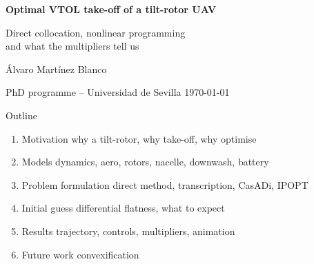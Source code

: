 \documentclass[11pt]{article}
\newcommand{\cursec}{}
\renewcommand{\section}[1]{\gdef\cursec{#1}}
\newcommand{\aircraft}[2]{%
  \begin{scope}[rotate=#2]
    \fill[gray!35, draw=gray!70!black, rounded corners=2pt] (-1.6,-0.17) rectangle (1.6,0.17);
    \fill[gray!70] (0.55,0.15) rectangle (1.05,0.21);      %
    \fill[gray!70] (-1.35,0.15) rectangle (-0.85,0.21);    %
    \foreach \xp in {0.8,-1.1}{
      \begin{scope}[shift={(\xp,0.45)}, rotate=#1-90]
        \fill[gray!55, draw=gray!70!black] (-0.07,-0.25) rectangle (0.07,0.1);
        \draw[line width=1.6pt, gray!40!black] (-0.5,0.12) -- (0.5,0.12);
      \end{scope}}
  \end{scope}}
\begin{document}
\begin{frame}[plain]
  \vspace*{9mm}
  {\LARGE\bfseries\color{accent} Optimal VTOL take-off of a tilt-rotor UAV\par}
  \vspace{2mm}
  {\large Direct collocation, nonlinear programming\\and what the multipliers tell us\par}
  \vspace{6mm}
  {\normalsize Álvaro Martínez Blanco\par}
  {\small\color{muted} PhD programme -- Universidad de Sevilla \quad\textbullet\quad \today\par}
  \vfill
  \hfill
\end{frame}

\begin{frame}{Outline}
  \vspace{4mm}
  \begin{enumerate}\large
    \item[\color{accent}1.] Motivation \hfill{\small\color{muted} why a tilt-rotor, why take-off, why optimise}
    \item[\color{accent}2.] Models \hfill{\small\color{muted} dynamics, aero, rotors, nacelle, downwash, battery}
    \item[\color{accent}3.] Problem formulation \hfill{\small\color{muted} direct method, transcription, CasADi, IPOPT}
    \item[\color{accent}4.] Initial guess \hfill{\small\color{muted} differential flatness, what to expect}
    \item[\color{accent}5.] Results \hfill{\small\color{muted} trajectory, controls, multipliers, animation}
    \item[\color{accent}6.] Future work \hfill{\small\color{muted} convexification}
  \end{enumerate}
\end{frame}


\section{Motivation}
\end{document}

